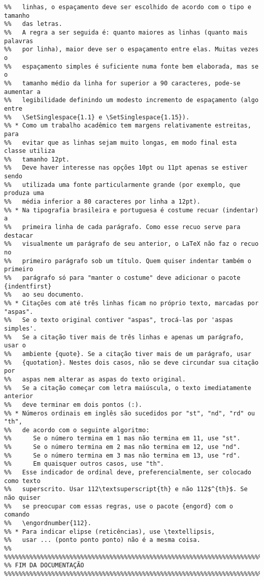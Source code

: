 \begin{verbatim}
%%   linhas, o espaçamento deve ser escolhido de acordo com o tipo e tamanho
%%   das letras.
%%   A regra a ser seguida é: quanto maiores as linhas (quanto mais palavras
%%   por linha), maior deve ser o espaçamento entre elas. Muitas vezes o
%%   espaçamento simples é suficiente numa fonte bem elaborada, mas se o
%%   tamanho médio da linha for superior a 90 caracteres, pode-se aumentar a
%%   legibilidade definindo um modesto incremento de espaçamento (algo entre
%%   \SetSinglespace{1.1} e \SetSinglespace{1.15}).
%% * Como um trabalho acadêmico tem margens relativamente estreitas, para
%%   evitar que as linhas sejam muito longas, em modo final esta classe utiliza
%%   tamanho 12pt.
%%   Deve haver interesse nas opções 10pt ou 11pt apenas se estiver sendo
%%   utilizada uma fonte particularmente grande (por exemplo, que produza uma
%%   média inferior a 80 caracteres por linha a 12pt).
%% * Na tipografia brasileira e portuguesa é costume recuar (indentar) a
%%   primeira linha de cada parágrafo. Como esse recuo serve para destacar
%%   visualmente um parágrafo de seu anterior, o LaTeX não faz o recuo no
%%   primeiro parágrafo sob um título. Quem quiser indentar também o primeiro
%%   parágrafo só para "manter o costume" deve adicionar o pacote {indentfirst}
%%   ao seu documento.
%% * Citações com até três linhas ficam no próprio texto, marcadas por "aspas".
%%   Se o texto original contiver "aspas", trocá-las por 'aspas simples'.
%%   Se a citação tiver mais de três linhas e apenas um parágrafo, usar o
%%   ambiente {quote}. Se a citação tiver mais de um parágrafo, usar
%%   {quotation}. Nestes dois casos, não se deve circundar sua citação por
%%   aspas nem alterar as aspas do texto original.
%%   Se a citação começar com letra maiúscula, o texto imediatamente anterior
%%   deve terminar em dois pontos (:).
%% * Números ordinais em inglês são sucedidos por "st", "nd", "rd" ou "th",
%%   de acordo com o seguinte algoritmo:
%%      Se o número termina em 1 mas não termina em 11, use "st".
%%      Se o número termina em 2 mas não termina em 12, use "nd".
%%      Se o número termina em 3 mas não termina em 13, use "rd".
%%      Em quaisquer outros casos, use "th".
%%   Esse indicador de ordinal deve, preferencialmente, ser colocado como texto
%%   superscrito. Usar 112\textsuperscript{th} e não 112$^{th}$. Se não quiser
%%   se preocupar com essas regras, use o pacote {engord} com o comando
%%   \engordnumber{112}.
%% * Para indicar elipse (reticências), use \textellipsis,
%%   usar ... (ponto ponto ponto) não é a mesma coisa.
%%
%%%%%%%%%%%%%%%%%%%%%%%%%%%%%%%%%%%%%%%%%%%%%%%%%%%%%%%%%%%%%%%%%%%%%%%%%%%%%%%
%% FIM DA DOCUMENTAÇÃO
%%%%%%%%%%%%%%%%%%%%%%%%%%%%%%%%%%%%%%%%%%%%%%%%%%%%%%%%%%%%%%%%%%%%%%%%%%%%%%%
\end{verbatim}